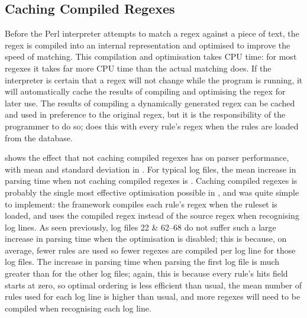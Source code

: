 \FloatBarrier{}

\subsection{Caching Compiled Regexes}

\label{Caching compiled regexes}

Before the Perl interpreter attempts to match a regex against a piece of
text, the regex is compiled into an internal representation and optimised
to improve the speed of matching.  This compilation and optimisation takes
CPU time: for most regexes it takes far more CPU time than the actual
matching does.  If the interpreter is certain that a regex will not change
while the program is running, it will automatically cache the results of
compiling and optimising the regex for later use.  The results of compiling
a dynamically generated regex can be cached and used in preference to the
original regex, but it is the responsibility of the programmer to do so;
\parsername{} does this with every rule's regex when the rules are loaded
from the database.

 shows the effect that not caching compiled regexes has on
parser performance, with mean and standard deviation in
.  For typical log files, the mean increase in parsing time
when not caching compiled regexes is
.  Caching
compiled regexes is probably the single most effective optimisation
possible in \parsername{}, and was quite simple to implement: the framework
compiles each rule's regex when the ruleset is loaded, and uses the
compiled regex instead of the source regex when recognising log lines.  As
seen previously, log files 22 \& 62--68 do not suffer such a large increase
in parsing time when the optimisation is disabled; this is because, on
average, fewer rules are used so fewer regexes are compiled per log line
for those log files.  The increase in parsing time when parsing the first
log file is much greater than for the other log files; again, this is
because every rule's hits field starts at zero, so optimal ordering is less
efficient than usual, the mean number of rules used for each log line is
higher than usual, and more regexes will need to be compiled when
recognising each log line.


